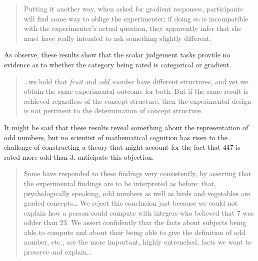 \begin{quote}
Putting it another way, when asked for gradient responses, participants will find some way to oblige the experimenter; if doing so is incompatible with the experimenter's actual question, they apparently infer that she must have really intended to ask something slightly different. \citep[24]{Schutze2011}
\end{quote}

As \citeauthor{Armstrong1983} observe, these results show that the scalar judgement tasks provide no evidence as to whether the category being rated is categorical or gradient.

\begin{quote}
\ldots{}we hold that \emph{fruit} and \emph{odd number} have different structures, and yet we obtain the same experimental outcome for both. But if the same result is achieved regardless of the concept structure, then the experimental design is not pertinent to the determination of concept structure. \citep[284--5]{Armstrong1983}
\end{quote}

It might be said that these results reveal something about the representation of odd numbers, but no scientist of mathematical cognition has risen to the challenge of constructing a theory that might account for the fact that 447 is rated more odd than 3. 
\citeauthor{Armstrong1983} anticipate this objection. 


\begin{quote}
Some have responded to these findings very consistently, by asserting that the experimental findings are to be interpreted as before: that, psychologically speaking, odd numbers as well as birds and vegetables are graded concepts\ldots{} We reject this conclusion just because we could not explain how a person could compute with integers who believed that 7 was odder than 23. We assert confidently that the facts about subjects being able to compute and about their being able to give the definition of odd number, etc., are the more important, highly entrenched, facts we want to preserve and explain\ldots{} \citep[284]{Armstrong1983}
\end{quote}


